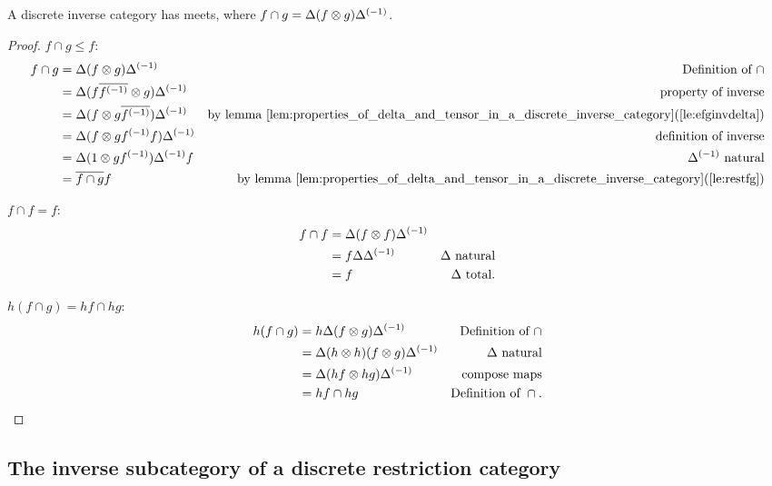 \begin{proposition}
  A discrete inverse category has meets, where $f\cap g =\Delta (f\otimes g) {\Delta}^{(-1)}$.
\end{proposition}
\begin{proof}
  $f\cap g \le f$:
  \begin{align*}
    f\cap g&= \Delta (f\otimes g) {\Delta}^{(-1)}&\text{Definition of }\cap \\
    &= \Delta (f\overline{{f}^{(-1)}}\otimes g) {\Delta}^{(-1)} &\text{property of inverse}\\
    &= \Delta (f \otimes g\overline{{f}^{(-1)}}) {\Delta}^{(-1)} &\text{by lemma \ref{lem:properties_of_delta_and_tensor_in_a_discrete_inverse_category}(\ref{le:efginvdelta})}\\
    &= \Delta (f \otimes g{f}^{(-1)}f) {\Delta}^{(-1)} &\text{definition of inverse}\\
    &= \Delta (1 \otimes g{f}^{(-1)}) {\Delta}^{(-1)} f &{\Delta}^{(-1)}\text{ natural}\\
    &=\overline{f \cap g} f &\text{by lemma \ref{lem:properties_of_delta_and_tensor_in_a_discrete_inverse_category}(\ref{le:restfg})}\\
  \end{align*}

  $f\cap f = f$:
  \begin{align*}
    f\cap f &= \Delta(f\otimes f) {\Delta}^{(-1)}\\
    &=f \Delta {\Delta}^{(-1)} &\Delta\text{ natural}\\
    &= f&\Delta\text{ total}.
  \end{align*}

  $h(f\cap g) = h f \cap hg$:
  \begin{align*}
    h(f\cap g) &= h \Delta(f\otimes g) {\Delta}^{(-1)}& \text{Definition of }\cap\\
    &= \Delta(h \otimes h) (f \otimes g) {\Delta}^{(-1)} &\Delta\text{ natural}\\
    &= \Delta(h f\otimes hg) {\Delta}^{(-1)} &\text{compose maps}\\
    &= h f \cap hg&\text{Definition of }\cap.
  \end{align*}
\end{proof}


\subsection{The inverse subcategory of a discrete restriction category } %
\label{sub:the_inverse_subcategory_of_a_discrete_restriction_category}

